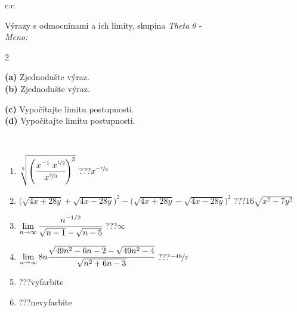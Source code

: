 \documentclass[10pt]{report}
\begin{document}
\begin{tabular}{c:c}
\begin{minipage}[c][104.5mm][t]{0.5\linewidth}
\begin{center}
\vspace{7mm}
{\huge {\Large Výrazy s odmocninami a ich limity}, skupina \textit{Theta $\theta$} -}\\[5mm]
\textit{Meno:}\phantom{xxxxxxxxxxxxxxxxxxxxxxxxxxxxxxxxxxxxxxxxxxxxxxxxxxxxxxxxxxxxxxxxx}\\[5mm]
\begin{minipage}{0.95\linewidth}
\begin{center}
{\small \begin{multicols}{2} \raggedright
\phantom{xxxxxxxxx}\textbf{(a)} Zjednodušte výraz. \\[1mm]
\phantom{xxxxxxxxx}\textbf{(b)} Zjednodušte výraz. \par \columnbreak
\textbf{(c)} Vypočítajte limitu postupnosti. \\[1mm]
\textbf{(d)} Vypočítajte limitu postupnosti.
\end{multicols}
}
\end{center}
\end{minipage}
\\[4mm]
\begin{minipage}{0.79\linewidth}
\begin{center}
\begin{varwidth}{\linewidth}
\begin{enumerate}
\small
\item $\sqrt[5]{\left(\cfrac{x^{-1}\;x^{\nicefrac{1}{2}}}{x^{\nicefrac{2}{3}}}\right)^{5}}$\quad \dotfill\; ???\;\dotfill \quad $x^{\nicefrac{-7}{6}}$
\item {\footnotesize{\scriptsize$\big(\sqrt{4x+28y}+\sqrt{4x-28y}\big)^2-\big(\sqrt{4x+28y}-\sqrt{4x-28y}\big)^2$}\quad \dotfill\; ???\;\dotfill \quad $16\sqrt{x^2-7y^2}$}
\item $\lim\limits_{n\to\infty}\cfrac{n^{-1/2}}{\sqrt{n-1}-\sqrt{n-5}}$\quad \dotfill\; ???\;\dotfill \quad $\infty$
\item $\lim\limits_{n\to\infty}8n\cfrac{\sqrt{49n^2-6n-2}-\sqrt{49n^2-4}}{\sqrt{n^2+6n-3}}$\quad \dotfill\; ???\;\dotfill \quad $\nicefrac{-48}{7}$
\item \quad \dotfill\; ???\;\dotfill \quad vyfarbite
\item \quad \dotfill\; ???\;\dotfill \quad nevyfarbite
\end{enumerate}
\end{varwidth}

\end{center}
\end{minipage}
\end{center}
\end{minipage}
\end{tabular}
\end{document}
